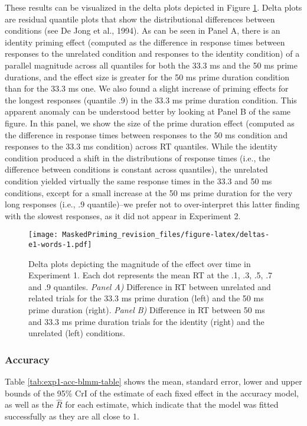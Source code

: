 \documentclass[
  english,
  man,floatsintext]{apa6}
\begin{document}
These results can be visualized in the delta plots depicted in Figure \ref{fig:deltas-e1-words}. Delta plots are residual quantile plots that show the distributional differences between conditions (see De Jong et al., 1994). As can be seen in Panel A, there is an identity priming effect (computed as the difference in response times between responses to the unrelated condition and responses to the identity condition) of a parallel magnitude across all quantiles for both the 33.3 ms and the 50 ms prime durations, and the effect size is greater for the 50 ms prime duration condition than for the 33.3 ms one. We also found a slight increase of priming effects for the longest responses (quantile .9) in the 33.3 ms prime duration condition. This apparent anomaly can be understood better by looking at Panel B of the same figure. In this panel, we show the size of the prime duration effect (computed as the difference in response times between responses to the 50 ms condition and responses to the 33.3 ms condition) across RT quantiles. While the identity condition produced a shift in the distributions of response times (i.e., the difference between conditions is constant across quantiles), the unrelated condition yielded virtually the same response times in the 33.3 and 50 ms conditions, except for a small increase at the 50 ms prime duration for the very long responses (i.e., .9 quantile)--we prefer not to over-interpret this latter finding with the slowest responses, as it did not appear in Experiment 2.

\begin{figure}
\centering
\texttt{[image: MaskedPriming\_revision\_files/figure-latex/deltas-e1-words-1.pdf]}
\caption{\label{fig:deltas-e1-words}Delta plots depicting the magnitude of the effect over time in Experiment 1. Each dot represents the mean RT at the .1, .3, .5, .7 and .9 quantiles. \emph{Panel A)} Difference in RT between unrelated and related trials for the 33.3 ms prime duration (left) and the 50 ms prime duration (right). \emph{Panel B)} Difference in RT between 50 ms and 33.3 ms prime duration trials for the identity (right) and the unrelated (left) conditions.}
\end{figure}

\hypertarget{accuracy}{%
\subsubsection{Accuracy}\label{accuracy}}

Table \ref{tab:exp1-acc-blmm-table} shows the mean, standard error, lower and upper bounds of the 95\% CrI of the estimate of each fixed effect in the accuracy model, as well as the \(\hat{R}\) for each estimate, which indicate that the model was fitted successfully as they are all close to 1.
\end{document}
